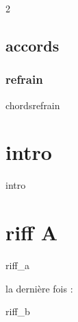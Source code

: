 \xxxstruct
\newpage
\begin{multicols}{2}
    \xxxlyrics
\end{multicols}

\newpage
\subsection{accords}
\subsubsection{refrain}
{chordsrefrain}



\section*{intro}
{intro}


\section{riff A}
{riff_a}

la derni\`ere fois :

{riff_b}






%    


%    
